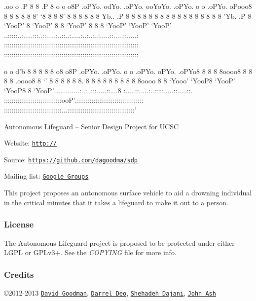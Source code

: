 \begin{DoxyVerb}     .oo          o                                                   
    .P 8          8                                                   
   .P  8 o    o  o8P .oPYo. odYo. .oPYo. ooYoYo. .oPYo. o    o .oPYo. 
  oPooo8 8    8   8  8    8 8' `8 8    8 8' 8  8 8    8 8    8 Yb..   
 .P    8 8    8   8  8    8 8   8 8    8 8  8  8 8    8 8    8   'Yb. 
.P     8 `YooP'   8  `YooP' 8   8 `YooP' 8  8  8 `YooP' `YooP' `YooP' 
..:::::..:.....:::..::.....:..::..:.....:..:..:..:.....::.....::.....:
::::::::::::::::::::::::::::::::::::::::::::::::::::::::::::::::::::::
::::::::::::::::::::::::::::::::::::::::::::::::::::::::::::::::::::::

       o      o  d'b                                        8 
       8         8                                          8 
       8     o8 o8P  .oPYo. .oPYo. o    o .oPYo. oPYo. .oPYo8 
       8      8  8   8oooo8 8    8 8    8 .oooo8 8  `' 8    8 
       8      8  8   8.     8    8 8    8 8    8 8     8    8 
       8oooo  8  8   `Yooo' `YooP8 `YooP' `YooP8 8     `YooP' 
 ............:..:..:::.....::....8 :.....::.....:..:::::.....::.....::.
::::::::::::::::::::::::::::::ooP'.:::::::::::::::::::::::::::::::::::
::::::::::::::::::::::::::::::...:::::::::::::::::::::::::::::::::::'
\end{DoxyVerb}


Autonomous Lifeguard -- Senior Design Project for U\-C\-S\-C


\begin{DoxyItemize}
\item Website\-: \href{http://}{\tt http\-://}
\item Source\-: \href{https://github.com/dagoodma/sdp}{\tt https\-://github.\-com/dagoodma/sdp}
\item Mailing list\-: \href{https://groups.google.com/a/ucsc.edu/forum/#!forum/albs-group}{\tt Google Groups}
\end{DoxyItemize}

This project proposes an autonomous surface vehicle to aid a drowning individual in the critical minutes that it takes a lifeguard to make it out to a person.

\subsubsection*{License}

The Autonomous Lifeguard project is proposed to be protected under either L\-G\-P\-L or G\-P\-Lv3+. See the {\itshape C\-O\-P\-Y\-I\-N\-G} file for more info.

\subsubsection*{Credits}

\copyright 2012-\/2013 \href{mailto:dagoodma@ucsc.edu}{\tt David Goodman}, \href{mailto:ddeo@ucsc.edu}{\tt Darrel Deo}, \href{mailto:sdajani@ucsc.edu}{\tt Shehadeh Dajani}, \href{mailto:jash@ucsc.edu}{\tt John Ash} 